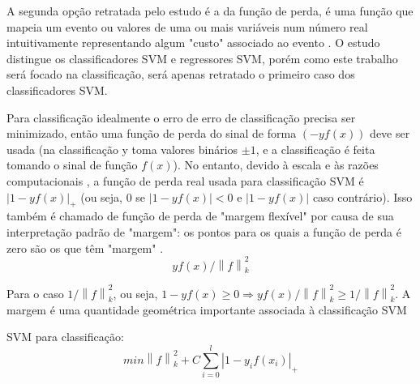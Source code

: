 A segunda opção retratada pelo estudo \cite{evgeniou1999support} é a da função de perda, é uma função que mapeia um evento ou valores de uma ou mais variáveis num número real intuitivamente representando algum "custo" associado ao evento \cite{wald1950statistical}. O estudo \cite{evgeniou1999support} distingue os classificadores SVM e regressores SVM, porém como este trabalho será focado na classificação, será apenas retratado o primeiro caso dos classificadores SVM.

Para classificação idealmente o erro de erro de classificação precisa ser minimizado, então uma função de perda do sinal de forma $ (-yf(x)) $ deve ser usada (na classificação y toma valores binários $ \pm1 $, e a classificação é feita tomando o sinal de função $ f(x) $). No entanto, devido à escala e às razões computacionais \cite{vapnik1998statistical}, a função de perda real usada para classificação SVM é $ |1-yf(x)|_{+} $ (ou seja, 0 se $ |1-yf(x)|< 0 $ e $ |1-yf(x)| $ caso contrário). Isso também é chamado de função de perda de "margem flexível" por causa de sua interpretação padrão de "margem": os pontos para os quais a função de perda é zero são os que têm "margem" \cite{evgeniou1999support}.\[yf(x)/\left \| f \right \|_{k}^{2}\]

Para o caso $ 1/\left \| f \right \|_{k}^{2} $, ou seja, $1-yf(x) \geq  0 \Rightarrow yf(x)/\left \| f \right \|_{k}^{2} \geq 1/\left \| f \right \|_{k}^{2} $. A margem é uma quantidade geométrica importante associada à classificação SVM \cite{evgeniou1999support}

SVM para classificação:
\[min\left \| f \right \|_{k}^{2}+C\sum_{i=0}^{l}\left | 1-y_{i}f(x_{i})\right |_{+}\]
